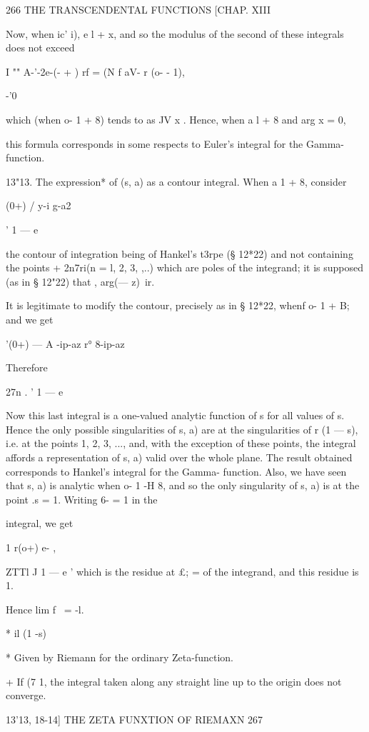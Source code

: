 266 THE TRANSCENDENTAL FUNCTIONS [CHAP. XIII

Now, when ic' i), e l + x, and so the modulus of the second of these
integrals does not exceed

I "" A-'-2e-(- + ) rf = (N f aV- r (o- - 1),

-'0

which (when o- 1 + 8) tends to as JV x . Hence, when a l + 8 and arg x
= 0,

this formula corresponds in some respects to Euler's integral for the
Gamma- function.

13"13. The expression* of (s, a) as a contour integral. When a 1 + 8,
consider

(0+) / y-i g-a2

' 1 — e

the contour of integration being of Hankel's t3rpe (§ 12*22) and not
containing the points + 2n7ri(n = l, 2, 3, ,..) which are poles of the
integrand; it is supposed (as in § 12"22) that , arg(— z)\ ir.

It is legitimate to modify the contour, precisely as in § 12*22, whenf
o- 1 + B; and we get

'(0+) — A -ip-az r° 8-ip-az

Therefore

27n . ' 1 — e

Now this last integral is a one-valued analytic function of s for all
values of s. Hence the only possible singularities of s, a) are at the
singularities of r (1 — s), i.e. at the points 1, 2, 3, ..., and, with
the exception of these points, the integral affords a representation
of s, a) valid over the whole plane. The result obtained corresponds
to Hankel's integral for the Gamma- function. Also, we have seen that
s, a) is analytic when o- 1 -H 8, and so the only singularity of s, a)
is at the point .s = 1. Writing 6- = 1 in the

integral, we get

1 r(o+) e- ,

ZTTl J 1 — e ' which is the residue at £; = of the integrand, and this
residue is 1.

Hence lim f \ = -l.

* il (1 -s)

* Given by Riemann for the ordinary Zeta-function.

+ If (7 1, the integral taken along any straight line up to the origin
does not converge.

13'13, 18-14] THE ZETA FUNXTION OF RIEMAXN 267

